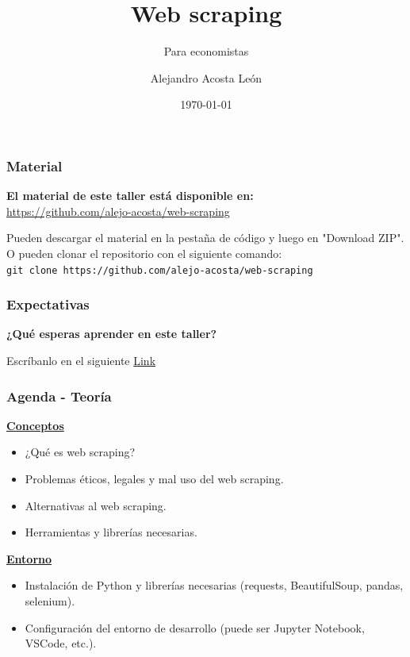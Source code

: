 \documentclass{beamer}
\title{Web scraping}
\subtitle{Para economistas}
\author{Alejandro Acosta León}
\date{\today}
\begin{document}
\maketitle


\begin{frame}
	\frametitle{Material}
	\begin{alertblock}{ }
		\centering
		\textbf{El material de este taller está disponible en:} \\ \url{https://github.com/alejo-acosta/web-scraping}
	\end{alertblock}
	\centering
	Pueden descargar el material en la pestaña de código y luego en "Download ZIP".  \\
	O pueden clonar el repositorio con el siguiente comando: \\
	\texttt{git clone https://github.com/alejo-acosta/web-scraping }

\end{frame}

\begin{frame}
	\frametitle{Expectativas}
	\begin{alertblock}{ }
		\centering
		\textbf{¿Qué esperas aprender en este taller?}
	\end{alertblock}
	\centering
	Escríbanlo en el siguiente \href{https://miro.com/app/board/uXjVKA1HUxk=/?share_link_id=961163594502}{Link}

\end{frame}


\begin{frame}
	\frametitle{Agenda - Teoría}
	\underline{\textbf{Conceptos}}
	\begin{itemize}
		\item ¿Qué es web scraping?
		\item Problemas éticos, legales y mal uso del web scraping.
		\item Alternativas al web scraping.
		\item Herramientas y librerías necesarias.
	\end{itemize}
	
	\underline{\textbf{Entorno}}
	\begin{itemize}
		\item Instalación de Python y librerías necesarias (requests, BeautifulSoup, pandas, selenium).
		\item Configuración del entorno de desarrollo (puede ser Jupyter Notebook, VSCode, etc.).
	\end{itemize}	
	
\end{frame}
\end{document}

